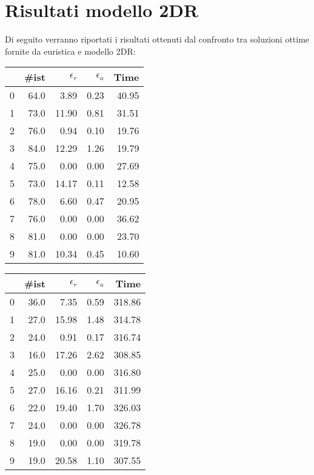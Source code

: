 \section{Risultati modello 2DR}
Di seguito verranno riportati i risultati ottenuti dal confronto tra soluzioni ottime fornite da euristica e modello 2DR:
\begin{center}
	\begin{table}[H]
		\begin{minipage}{0.4\textwidth}
			\centering
			\begin{tabular}{lrrrr}
				\toprule
				{} & \#ist & $\epsilon_r$ & $\epsilon_a$ & Time  \\
				\midrule
				0  & 64.0  & 3.89         & 0.23         & 40.95 \\
				1  & 73.0  & 11.90        & 0.81         & 31.51 \\
				2  & 76.0  & 0.94         & 0.10         & 19.76 \\
				3  & 84.0  & 12.29        & 1.26         & 19.79 \\
				4  & 75.0  & 0.00         & 0.00         & 27.69 \\
				5  & 73.0  & 14.17        & 0.11         & 12.58 \\
				6  & 78.0  & 6.60         & 0.47         & 20.95 \\
				7  & 76.0  & 0.00         & 0.00         & 36.62 \\
				8  & 81.0  & 0.00         & 0.00         & 23.70 \\
				9  & 81.0  & 10.34        & 0.45         & 10.60 \\
				\bottomrule
			\end{tabular}
		\end{minipage}
		\begin{minipage}{0.5\textwidth}
			\centering
			\begin{tabular}{lrrrr}
				\toprule
				{} & \#ist & $\epsilon_r$ & $\epsilon_a$ & Time   \\
				\midrule
				0  & 36.0  & 7.35         & 0.59         & 318.86 \\
				1  & 27.0  & 15.98        & 1.48         & 314.78 \\
				2  & 24.0  & 0.91         & 0.17         & 316.74 \\
				3  & 16.0  & 17.26        & 2.62         & 308.85 \\
				4  & 25.0  & 0.00         & 0.00         & 316.80 \\
				5  & 27.0  & 16.16        & 0.21         & 311.99 \\
				6  & 22.0  & 19.40        & 1.70         & 326.03 \\
				7  & 24.0  & 0.00         & 0.00         & 326.78 \\
				8  & 19.0  & 0.00         & 0.00         & 319.78 \\
				9  & 19.0  & 20.58        & 1.10         & 307.55 \\
				\bottomrule
			\end{tabular}
		\end{minipage}
	\end{table}
\end{center}
